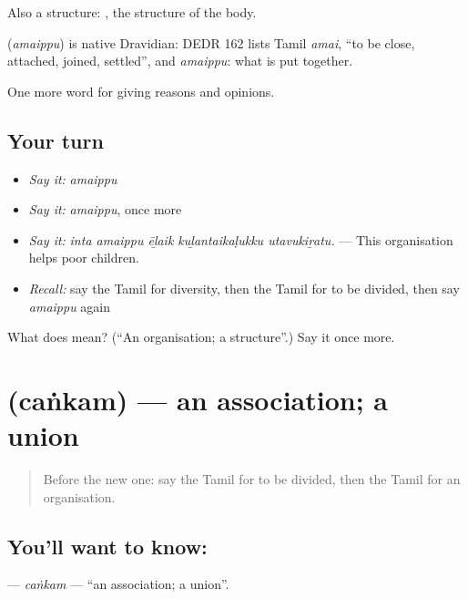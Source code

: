 Also a structure:  , the structure of the body.

\begin{cousinweb}
\textbf{} (\emph{amaippu}) is native Dravidian: DEDR 162 lists Tamil \emph{amai}, \textquotedblleft{}to be close, attached, joined, settled\textquotedblright{}, and \emph{amaippu}: what is put together.
\end{cousinweb}

\begin{grammarlens}[title={What you've built}]
One more word for giving reasons and opinions.
\end{grammarlens}

\subsection*{Your turn}
\begin{itemize}
\raggedright
  \item \emph{Say it:} \emph{amaippu}
  \item \emph{Say it:} \emph{amaippu}, once more
  \item \emph{Say it:} \emph{inta amaippu ēḻaik kuḻantaikaḷukku utavukiṟatu.} — This organisation helps poor children.
  \item \emph{Recall:} say the Tamil for diversity, then the Tamil for to be divided, then say \emph{amaippu} again
\end{itemize}

\begin{tcolorbox}[breakable,colback=teal!4,colframe=teal!35!black,title={Before you move on}]
What does  mean? (\textquotedblleft{}An organisation; a structure\textquotedblright{}.) Say it once more.
\end{tcolorbox}
\section[\texorpdfstring{\ta{சங்கம்} (caṅkam)}{சங்கம் (caṅkam)}]{ (caṅkam) — an association; a union}

\label{lesson:TA-C378-cankam}



\begin{quote}
Before the new one: say the Tamil for to be divided, then the Tamil for an organisation.
\end{quote}

\subsection*{You'll want to know: }
\textbf{} — \emph{caṅkam} — \textquotedblleft{}an association; a union\textquotedblright{}.

